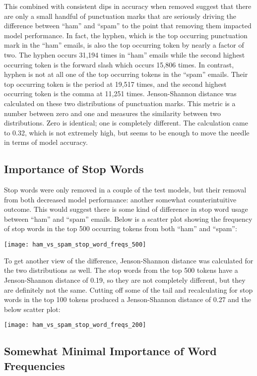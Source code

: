\documentclass[a4paper]{article}
\begin{document}
	This combined with consistent dips in accuracy when removed suggest that there are only a small handful of punctuation marks that are seriously driving the difference between “ham” and “spam” to the point that removing them  impacted model performance. In fact, the hyphen, which is the top occurring punctuation mark in the “ham” emails, is also the top occurring token by nearly a factor of two. The hyphen occurs 31,194 times in “ham” emails while the second highest occurring token is the forward slash which occurs 15,806 times. In contrast, hyphen is not at all one of the top occurring tokens in the “spam” emails. Their top occurring token is the period at 19,517 times, and the second highest occurring token is the comma at 11,251 times. Jenson-Shannon distance was calculated on these two distributions of punctuation marks. This metric is a number between zero and one and measures the similarity between two distributions. Zero is identical; one is completely different. The calculation came to 0.32, which is not extremely high, but seems to be enough to move the needle in terms of model accuracy.

	\subsection{Importance of Stop Words}
	
	Stop words were only removed in a couple of the test models, but their removal from both decreased model performance: another somewhat counterintuitive outcome. This would suggest there is some kind of difference in stop word usage between “ham” and “spam” emails. Below is a scatter plot showing the frequency of stop words in the top 500 occurring tokens from both “ham” and “spam”:
	
	\texttt{[image: ham\_vs\_spam\_stop\_word\_freqs\_500]}
	
	To get another view of the difference, Jenson-Shannon distance was calculated for the two distributions as well. The stop words from the top 500 tokens have a Jenson-Shannon distance of 0.19, so they are not completely different, but they are definitely not the same. Cutting off some of the tail and recalculating for stop words in the top 100 tokens produced a Jenson-Shannon distance of 0.27 and the below scatter plot:
	
	\texttt{[image: ham\_vs\_spam\_stop\_word\_freqs\_200]}
	
	\subsection{Somewhat Minimal Importance of Word Frequencies}
	
\end{document}
